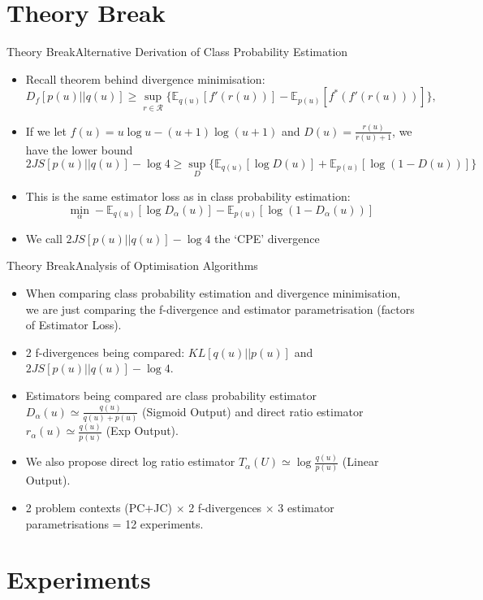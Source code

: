 \documentclass{beamer}
\newcommand{\E}{\mathbb{E}}
\begin{document}
\section{Theory Break}
\begin{frame}{Theory Break}{Alternative Derivation of Class Probability Estimation}
\begin{itemize}
\item Recall theorem behind divergence minimisation:
\[D_f [p(u)||q(u)]\geq \sup_{r\in \mathcal{R}} \{\mathbb{E}_{q(u)}[f'(r(u))]-\mathbb{E}_{p(u)}[f^*(f'(r(u)))]\},\]
\item If we let $f(u)=u\log u-(u+1)\log (u+1)$ and $D(u)=\frac{r(u)}{r(u)+1}$, we have the lower bound
\[2JS[p(u)||q(u)]-\log 4\geq \sup_{D}\{\E_{q(u)}[\log D(u)]+\E_{p(u)}[\log(1-D(u))]\}\]
\item This is the same estimator loss as in class probability estimation:
\[\min_\alpha -\mathbb{E}_{q(u)}[\log D_\alpha(u)]-\mathbb{E}_{p(u)}[\log(1-D_\alpha(u))]\]
\item We call $2JS[p(u)||q(u)]-\log 4$ the `CPE' divergence
\end{itemize}
\end{frame}
\begin{frame}{Theory Break}{Analysis of Optimisation Algorithms}
\begin{itemize}
\item When comparing class probability estimation and divergence minimisation, we are just comparing the f-divergence and estimator parametrisation (factors of Estimator Loss).
\item 2 f-divergences being compared: $KL[q(u)||p(u)]$ and $2JS[p(u)||q(u)]-\log 4$.
\item Estimators being compared are class probability estimator $D_\alpha(u)\simeq \frac{q(u)}{q(u)+p(u)}$ (Sigmoid Output) and direct ratio estimator $r_\alpha(u)\simeq \frac{q(u)}{p(u)}$ (Exp Output).
\item We also propose direct log ratio estimator $T_\alpha(U)\simeq \log \frac{q(u)}{p(u)}$ (Linear Output).
\item 2 problem contexts (PC+JC) $\times$ 2 f-divergences $\times$ 3 estimator parametrisations = 12 experiments.
\end{itemize}
\end{frame}
\section{Experiments}
\end{document}
